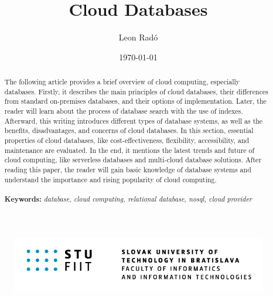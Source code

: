 \documentclass[12pt, a4paper]{article}
\title{\Huge Cloud Databases}
\author{\Large Leon Radó}
\date{\today}
\begin{document}
\maketitle
\begin{figure}[b]
    \centering
    \includegraphics[width=0.8\linewidth]{images/STU-FIIT.png}
\end{figure}
\thispagestyle{empty}

\clearpage
\tableofcontents

\clearpage
\begin{abstract}
    The following article provides a brief overview of cloud computing, especially databases. Firstly, it describes the main principles of cloud databases, their differences from standard on-premises databases, and their options of implementation. Later, the reader will learn about the process of database search with the use of indexes. Afterward, this writing introduces different types of database systems, as well as the benefits, disadvantages, and concerns of cloud databases. In this section, essential properties of cloud databases, like cost-effectiveness, flexibility, accessibility, and maintenance are evaluated. In the end, it mentions the latest trends and future of cloud computing, like serverless databases and multi-cloud database solutions. After reading this paper, the reader will gain basic knowledge of database systems and understand the importance and rising popularity of cloud computing.\\\\
    \footnotesize{\textbf{Keywords: }\textit{database, cloud computing, relational database, nosql, cloud provider}}
\end{abstract}
\clearpage
\end{document}
